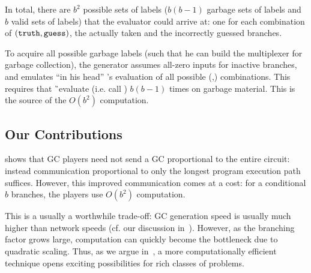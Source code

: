 In total, there are $b^2$ possible sets of labels ($b(b-1)$ garbage sets of labels and $b$ valid sets of labels)  that the evaluator
could arrive at: one for each combination of $(\mathtt{truth},\mathtt{guess})$, the  actually taken  and
the incorrectly guessed branches.
%


To acquire all possible garbage labels (such that he can build the multiplexer
for garbage collection), the \HK generator assumes all-zero inputs for
inactive branches, and emulates ``in his head'' \E's evaluation of all possible (\truth,\guess) combinations.
This requires that \G\ evaluate (i.e. call \Ev) $b(b-1)$ times on garbage material.
This is the source of the $O(b^2)$ computation.






\subsection{Our Contributions}
\label{sec:ourContrib}

\HK shows that GC players need not send a GC
proportional to the entire circuit:
instead communication proportional to only the longest program execution
path suffices.
However, this improved communication comes at a cost:
for a conditional $b$ branches, the players
use $O(b^2)$ computation. 

This is a usually a worthwhile trade-off: GC generation speed is usually much higher
than network speeds (cf. our discussion in~).
However, as the branching factor grows large, computation
can quickly become the bottleneck due to quadratic scaling.
%
Thus, as we argue in~,
a more computationally efficient technique
opens exciting possibilities for rich classes of problems.

